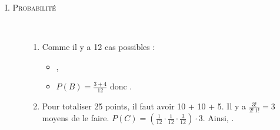 \begin{description}
   \item[I. \textsc{Probabilit\'e}] ~\newline
      \begin{enumerate}
         \item {}
            Comme il y a 12 cas possibles :
            \begin{itemize}
               \item {},
               \item $P(B) = \frac{3+4}{12}$ donc
                  .
            \end{itemize}
         \item 
            Pour totaliser 25 points, il faut avoir 10 + 10 + 5.
            Il y a $\frac{3!}{2! \ 1!} = 3$ moyens de le faire.
            $P(C) = \left( \frac{1}{12} \cdot \frac{1}{12} \cdot \frac{3}{12} \right) \cdot 3$.
            Ainsi, .
                  

\end{enumerate}
\end{description}
